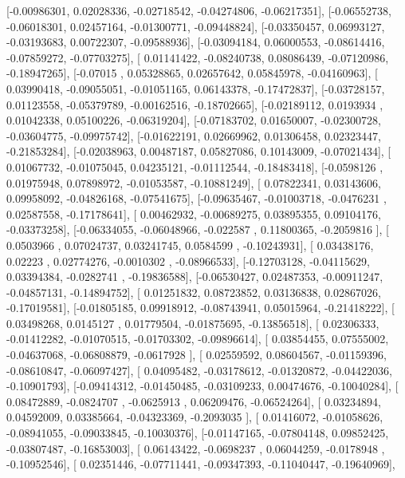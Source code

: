 \documentclass{article}
\begin{document}
       [-0.00986301,  0.02028336, -0.02718542, -0.04274806, -0.06217351],
       [-0.06552738, -0.06018301,  0.02457164, -0.01300771, -0.09448824],
       [-0.03350457,  0.06993127, -0.03193683,  0.00722307, -0.09588936],
       [-0.03094184,  0.06000553, -0.08614416, -0.07859272, -0.07703275],
       [ 0.01141422, -0.08240738,  0.08086439, -0.07120986, -0.18947265],
       [-0.07015   ,  0.05328865,  0.02657642,  0.05845978, -0.04160963],
       [ 0.03990418, -0.09055051, -0.01051165,  0.06143378, -0.17472837],
       [-0.03728157,  0.01123558, -0.05379789, -0.00162516, -0.18702665],
       [-0.02189112,  0.0193934 ,  0.01042338,  0.05100226, -0.06319204],
       [-0.07183702,  0.01650007, -0.02300728, -0.03604775, -0.09975742],
       [-0.01622191,  0.02669962,  0.01306458,  0.02323447, -0.21853284],
       [-0.02038963,  0.00487187,  0.05827086,  0.10143009, -0.07021434],
       [ 0.01067732, -0.01075045,  0.04235121, -0.01112544, -0.18483418],
       [-0.0598126 ,  0.01975948,  0.07898972, -0.01053587, -0.10881249],
       [ 0.07822341,  0.03143606,  0.09958092, -0.04826168, -0.07541675],
       [-0.09635467, -0.01003718, -0.0476231 ,  0.02587558, -0.17178641],
       [ 0.00462932, -0.00689275,  0.03895355,  0.09104176, -0.03373258],
       [-0.06334055, -0.06048966, -0.022587  ,  0.11800365, -0.2059816 ],
       [ 0.0503966 ,  0.07024737,  0.03241745,  0.0584599 , -0.10243931],
       [ 0.03438176,  0.02223   ,  0.02774276, -0.0010302 , -0.08966533],
       [-0.12703128, -0.04115629,  0.03394384, -0.0282741 , -0.19836588],
       [-0.06530427,  0.02487353, -0.00911247, -0.04857131, -0.14894752],
       [ 0.01251832,  0.08723852,  0.03136838,  0.02867026, -0.17019581],
       [-0.01805185,  0.09918912, -0.08743941,  0.05015964, -0.21418222],
       [ 0.03498268,  0.0145127 ,  0.01779504, -0.01875695, -0.13856518],
       [ 0.02306333, -0.01412282, -0.01070515, -0.01703302, -0.09896614],
       [ 0.03854455,  0.07555002, -0.04637068, -0.06808879, -0.0617928 ],
       [ 0.02559592,  0.08604567, -0.01159396, -0.08610847, -0.06097427],
       [ 0.04095482, -0.03178612, -0.01320872, -0.04422036, -0.10901793],
       [-0.09414312, -0.01450485, -0.03109233,  0.00474676, -0.10040284],
       [ 0.08472889, -0.0824707 , -0.0625913 ,  0.06209476, -0.06524264],
       [ 0.03234894,  0.04592009,  0.03385664, -0.04323369, -0.2093035 ],
       [ 0.01416072, -0.01058626, -0.08941055, -0.09033845, -0.10030376],
       [-0.01147165, -0.07804148,  0.09852425, -0.03807487, -0.16853003],
       [ 0.06143422, -0.0698237 ,  0.06044259, -0.0178948 , -0.10952546],
       [ 0.02351446, -0.07711441, -0.09347393, -0.11040447, -0.19640969],
\end{document}
